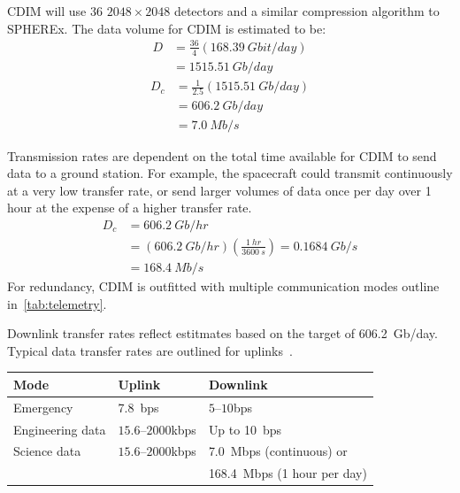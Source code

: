 \documentclass{ws-jai}
\begin{document}
CDIM will use 36 $2048\times2048$ detectors and a similar compression algorithm to SPHEREx.
The data volume for CDIM is estimated to be:
\begin{equation}\label{eq:telemetry-d}
  \begin{split}
    D &= \frac{36}{4} (\SI{168.39}{Gbit/day}) \\
    &= \SI{1515.51}{Gb/day}
  \end{split}
\end{equation}
\begin{equation} \label{eq:telemetry-dc}
  \begin{split}
    D_c &= \frac{1}{2.5}(\SI{1515.51}{Gb/day}) \\
    &= \SI{606.2}{Gb/day} \\
    &= \SI{7.0}{Mb/s}
  \end{split}
\end{equation}

Transmission rates are dependent on the total time available for CDIM to send data to a ground station.
For example, the spacecraft could transmit continuously at a very low transfer rate, or send larger volumes of data once per day over 1 hour at the expense of a higher transfer rate.
\begin{equation}\label{eq:telemetry-1hr}
  \begin{split}
    D_c &= \SI{606.2}{Gb/hr}  \\
     &= (\SI{606.2}{Gb/hr})(\frac{\SI{1}{hr}}{\SI{3600}{s}}) = \SI{0.1684}{Gb/s} \\
     &= \SI{168.4}{Mb/s}
  \end{split}
\end{equation}
For redundancy, CDIM is outfitted with multiple communication modes outline in~\autoref{tab:telemetry}.

\begin{wstable}[htb]
  \caption{Downlink transfer rates reflect estitmates based on the target of \SI{606.2}{Gb/day}.
  Typical data transfer rates are outlined for uplinks~\cite{smad2015}.
\label{tab:telemetry}}
  \begin{tabular}{@{}lll@{}} \toprule
    Mode & Uplink & Downlink \\ \midrule
    Emergency & \SI{7.8}{bps} & $5$--$10$\si{bps} \\
    Engineering data & $15.6$--$2000$\si{kbps} & Up to \SI{10}{bps} \\
    Science data & $15.6$--$2000$\si{kbps} & \SI{7.0}{Mbps} (continuous) or \\
    & & \SI{168.4}{Mbps} (1 hour per day)\\\bottomrule
  \end{tabular}
\end{wstable}
\end{document}
